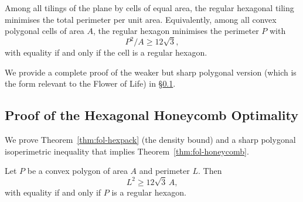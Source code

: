 \begin{theorem}
\label{thm:fol-honeycomb}
Among all tilings of the plane by cells of equal area, the regular
hexagonal tiling minimises the total perimeter per unit area.
Equivalently, among all convex polygonal cells of area \(A\),
the regular hexagon minimises the perimeter \(P\) with
\[
  P^2 / A \ge 12\sqrt{3},
\]
with equality if and only if the cell is a regular hexagon.
\end{theorem}

We provide a complete proof of the weaker but sharp polygonal version
(which is the form relevant to the Flower of Life) in
§\ref{subsec:fol-honeycomb-proof}.

\subsection{Proof of the Hexagonal Honeycomb Optimality}
\label{subsec:fol-honeycomb-proof}

We prove Theorem~\ref{thm:fol-hexpack} (the density bound) and a sharp
polygonal isoperimetric inequality that implies
Theorem~\ref{thm:fol-honeycomb}.

\begin{theorem}
\label{thm:fol-isoperim}
Let \(P\) be a convex polygon of area \(A\) and perimeter \(L\).  Then
\[
  L^2 \ge 12\sqrt{3}\,A,
\]
with equality if and only if \(P\) is a regular hexagon.
\end{theorem}

